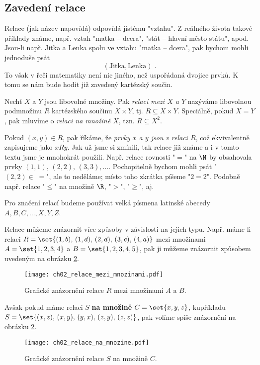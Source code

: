 \subsection{Zavedení relace}
Relace (jak název napovídá) odpovídá jistému "vztahu". Z reálného života takové příklady známe, např. vztah "matka -- dcera", "stát -- hlavní město státu", apod. Jsou-li např. Jitka a Lenka spolu ve vztahu "matka -- dcera", pak bychom mohli jednoduše psát
\begin{equation*}
    (\text{Jitka}, \text{Lenka})\; .
\end{equation*}
To však v řeči matematiky není nic jiného, než uspořádaná dvojice prvků. K tomu se nám bude hodit již zavedený kartézský součin.
\begin{definition}[Relace]\label{def:relace}
    Nechť $X$ a $Y$ jsou libovolné množiny. Pak \emph{relací mezi $X$ a $Y$} nazýváme libovolnou podmnožinu $R$ kartézského součinu $X\times Y$, tj. $R\subseteq X \times Y$. Speciálně, pokud $X=Y$, pak mluvíme o \emph{relaci na množině $X$}, tzn. $R\subseteq X^2$.
\end{definition}
Pokud $(x,y)\in R$, pak říkáme, že \emph{prvky $x$ a $y$ jsou v relaci $R$}, což ekvivalentně zapisujeme jako $xRy$. Jak už jsme si zmínili, tak relace již známe a i v tomto textu jsme je mnohokrát použili. Např. relace rovnosti "$=$" na $\N$ by obsahovala prvky $(1,1),\,(2,2),\,(3,3),\ldots$. Pochopitelně bychom mohli psát "$(2,2)\in\;=$", ale to neděláme; místo toho zkrátka píšeme "$2=2$". Podobně např. relace "$\leq$" na množině $\R$, "$>$", "$\geq$", aj.
\begin{convention}
    Pro značení relací budeme používat velká písmena latinské abecedy $A,B,C,\ldots,X,Y,Z$.
\end{convention}
Relace můžeme znázornit více způsoby v závislosti na jejich typu. Např. máme-li relaci $R=\set{(1,b),\,(1,d),\,(2,d),\,(3,c),\,(4,a)}$ mezi množinami $A=\set{1,2,3,4}$ a $B=\set{1,2,3,4,5}$, pak ji můžeme znázornit způsobem uvedeným na obrázku \ref{fig:relace_mezi_mnozinami}.
\begin{figure}[h]
    \centering
    \texttt{[image: ch02\_relace\_mezi\_mnozinami.pdf]}
    \caption{Grafické znázornění relace $R$ mezi množinami $A$ a $B$.}
    \label{fig:relace_mezi_mnozinami}
\end{figure}
Avšak pokud máme relaci $S$ \textbf{na množině} $C=\set{x,y,z}$, kupříkladu $S=\set{(x,z),\,(x,y),\,(y,x),\,(z,y),\,(z,z)}$, pak volíme spíše znázornění na obrázku \ref{fig:relace_mezi_mnozinami}.
\begin{figure}[h]
    \centering
    \texttt{[image: ch02\_relace\_na\_mnozine.pdf]}
    \caption{Grafické znázornění relace $S$ na množině $C$.}
    \label{fig:relace_mezi_mnozinami}
\end{figure}

